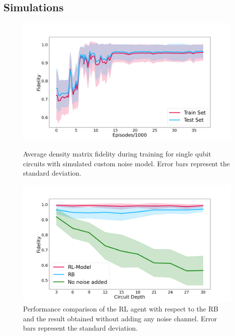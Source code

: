 \documentclass[referee,sn-basic]{sn-jnl} %
\begin{document}
\subsection{Simulations} \label{sec_simulation}

\begin{figure}
    \centering
    \includegraphics[width=\textwidth]{1Q_train_results.png}
    \caption{Average density matrix fidelity during training for single qubit circuits with simulated 
    custom noise model. Error bars represent the standard deviation.}\label{fig_1q_sim_train}
    \includegraphics[width=\textwidth]{1Q_rb.png}
    \caption{Performance comparison of the RL agent with respect to the RB and the result obtained 
    without adding any noise channel. Error bars represent the standard deviation.}\label{fig_1q_sim_bench}
\end{figure}
\end{document}
